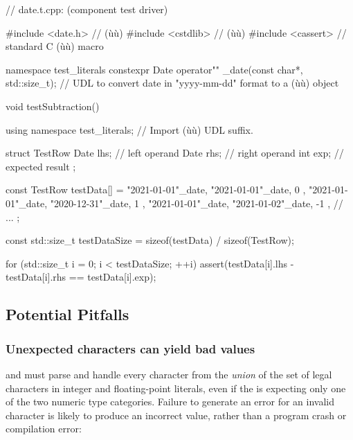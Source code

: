 \begin{emcppslisting}[emcppsbatch=e21]
// date.t.cpp: (component test driver)

#include <date.h>   // (ù{}ù)
#include <cstdlib>  // (ù{}ù)
#include <cassert>  // standard C (ù{}ù) macro

namespace test_literals
{
    constexpr Date operator"" _date(const char*, std::size_t);
        // UDL to convert date in "yyyy-mm-dd" format to a (ù{}ù) object
}

void testSubtraction()
{
    using namespace test_literals;  // Import (ù{}ù) UDL suffix.

    struct TestRow
    {
        Date lhs;  // left operand
        Date rhs;  // right operand
        int  exp;  // expected result
    };

    const TestRow testData[] =
    {
        { "2021-01-01"_date, "2021-01-01"_date,  0 },
        { "2021-01-01"_date, "2020-12-31"_date,  1 },
        { "2021-01-01"_date, "2021-01-02"_date, -1 },
        // ...
    };

    const std::size_t testDataSize = sizeof(testData) / sizeof(TestRow);

    for (std::size_t i = 0; i < testDataSize; ++i)
    {
        assert(testData[i].lhs - testData[i].rhs == testData[i].exp);
    }
}
\end{emcppslisting}
    

\subsection[Potential Pitfalls]{Potential Pitfalls}\label{potential-pitfalls-defmemberinit}

\subsubsection[Unexpected characters can yield bad values]{Unexpected characters can yield bad values}\label{unexpected-characters-can-yield-bad-values}

 and  must
parse and handle every character from the \emph{union} of the set of
legal characters in integer and floating-point literals, even if the
 is expecting only one of the two numeric type
categories. Failure to generate an error for an invalid character is
likely to produce an incorrect value, rather than a program crash or
compilation error:

